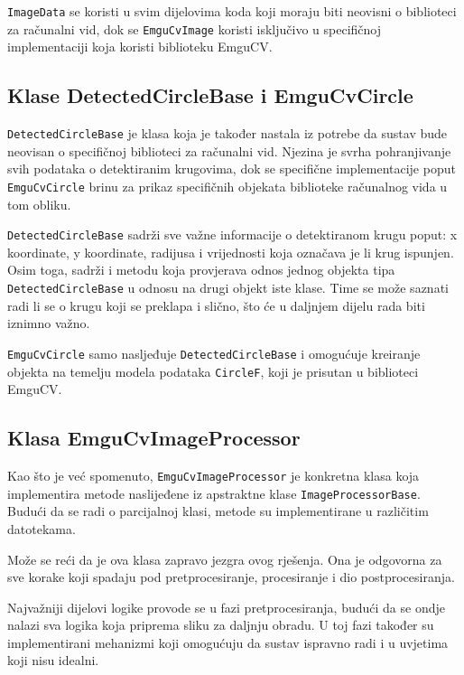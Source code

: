 \documentclass{foi}
\begin{document}
\texttt{ImageData} se koristi u svim dijelovima koda koji moraju biti neovisni o biblioteci za računalni vid, dok se \texttt{EmguCvImage} koristi isključivo u specifičnoj implementaciji koja koristi biblioteku EmguCV.

\subsection{Klase DetectedCircleBase i EmguCvCircle}

\texttt{DetectedCircleBase} je klasa koja je također nastala iz potrebe da sustav bude neovisan o specifičnoj biblioteci za računalni vid. Njezina je svrha pohranjivanje svih podataka o detektiranim krugovima, dok se specifične implementacije poput \texttt{EmguCvCircle} brinu za prikaz specifičnih objekata biblioteke računalnog vida u tom obliku.

\texttt{DetectedCircleBase} sadrži sve važne informacije o detektiranom krugu poput: x koordinate, y koordinate, radijusa i vrijednosti koja označava je li krug ispunjen. Osim toga, sadrži i metodu koja provjerava odnos jednog objekta tipa \texttt{DetectedCircleBase} u odnosu na drugi objekt iste klase. Time se može saznati radi li se o krugu koji se preklapa i slično, što će u daljnjem dijelu rada biti iznimno važno.

\texttt{EmguCvCircle} samo nasljeđuje \texttt{DetectedCircleBase} i omogućuje kreiranje objekta na temelju modela podataka \texttt{CircleF}, koji je prisutan u biblioteci EmguCV.


\subsection{Klasa EmguCvImageProcessor}

Kao što je već spomenuto, \texttt{EmguCvImageProcessor} je konkretna klasa koja implementira metode naslijeđene iz apstraktne klase \texttt{ImageProcessorBase}. Budući da se radi o parcijalnoj klasi, metode su implementirane u različitim datotekama.

Može se reći da je ova klasa zapravo jezgra ovog rješenja. Ona je odgovorna za sve korake koji spadaju pod pretprocesiranje, procesiranje i dio postprocesiranja.

Najvažniji dijelovi logike provode se u fazi pretprocesiranja, budući da se ondje nalazi sva logika koja priprema sliku za daljnju obradu. U toj fazi također su implementirani mehanizmi koji omogućuju da sustav ispravno radi i u uvjetima koji nisu idealni.
\end{document}
